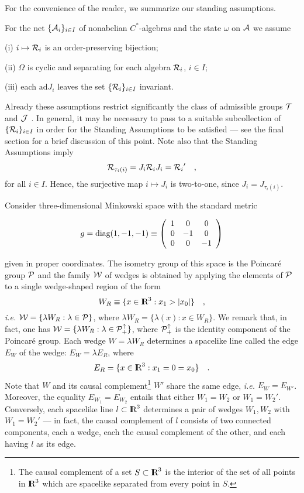 \documentclass[a4paper,twoside,12pt]{article}
\def\nind{\noindent}
\def\inet{{\{\As_i \}_{i \in I}}}
\def\irnet{{\{\Rs_i \}_{i \in I}}}
\def\diag{{\textnormal{diag}}}
\def\As{{\cal A}}
\def\Js{{\cal J}}
\def\Ps{{\cal P}}
\def\Rs{{\cal R}}
\def\Ts{{\cal T}}
\def\Ws{{\cal W}}
\def\Pid{{\Ps_+ ^{\uparrow}}}
\def\RR{\textnormal{{\rm I \hskip -5.75pt R}}}
\def\ad{{\mathrm{ad}}}
\def\diag{{\textnormal{diag}}}
\def\Pid{{\Ps_+ ^{\uparrow}}}
\begin{document}
     For the convenience of the reader, we summarize our standing assumptions. 

\medskip

\nind{\bf Standing Assumptions} For the net $\inet$ of nonabelian 
$C^*$-algebras and the state $\omega$ on $\As$ we assume \par
   (i) $i \mapsto \Rs_i$ is an order-preserving bijection; \par
   (ii) $\Omega$ is cyclic and separating for each algebra $\Rs_i$, $i \in I$;
\par
   (iii) each $\ad J_i$ leaves the set $\irnet$ invariant.

\medskip

\nind Already these assumptions restrict significantly the class of
admissible groups $\Ts$ and $\Js$ \cite{BDFS}. In general, it may be
necessary to pass to a suitable subcollection of $\{ \Rs_i \}_{i \in I}$ 
in order for the Standing Assumptions to be satisfied \cite{BDFS} ---
see the final section for a brief discussion of this point. 
Note also that the Standing Assumptions imply
%
\begin{equation}
\Rs_{\tau_i(i)} = J_i \Rs_i J_i = \Rs_i{}' \quad , \label{ambiguity}
\end{equation}
%
for all $i \in I$. Hence, the surjective map $i \mapsto J_i$ is
two-to-one, since $J_i = J_{\tau_i(i)}$.

     Consider three-dimensional Minkowski space with the standard metric

$$g = \diag(1,-1,-1) \equiv 
\left( \begin{array}{ccc}
               1 & 0 & 0  \\ 
               0 & -1 & 0  \\
               0 & 0 & -1 
\end{array} \right) $$

\nind given in proper coordinates. The isometry group of this 
space is the Poincar\'e group $\Ps$ and the family $\Ws$ of wedges 
is obtained by applying the elements of $\Ps$ to a single wedge-shaped region 
of the form
%
$$W_R \equiv \{ x \in \RR^3 : x_1 > \vert x_0 \vert \} \quad , $$
%
{\it i.e.} $\Ws = \{ \lambda W_R : \lambda \in \Ps \}$, where
$\lambda W_R = \{ \lambda(x) : x \in W_R \}$. We remark that,
in fact, one has $\Ws = \{ \lambda W_R : \lambda \in \Pid \}$, where
$\Pid$ is the identity component of the Poincar\'e group. Each wedge
$W = \lambda W_R$ determines a spacelike line called the edge $E_W$ of 
the wedge: $E_W = \lambda E_R$, where
%
$$E_R = \{ x \in \RR^3 : x_1 = 0 = x_0 \} \quad . $$
%
Note that $W$ and its causal complement\footnote{The causal complement of a
set $S \subset \RR^3$ is the interior of the set of all points in $\RR^3$
which are spacelike separated from every point in $S$.} $W'$ share the 
same edge, {\it i.e.} $E_W = E_{W'}$. Moreover, the equality 
$E_{W_1} = E_{W_2}$ entails that either $W_1 = W_2$ or $W_1 = W_2{}'$. 
Conversely, each spacelike line $l \subset \RR^3$ determines a pair of 
wedges $W_1,W_2$ with $W_1 = W_2{}'$ --- in fact, the causal complement of
$l$ consists of two connected components, each a wedge, each the causal 
complement of the other, and each having $l$ as its edge.
\end{document}
